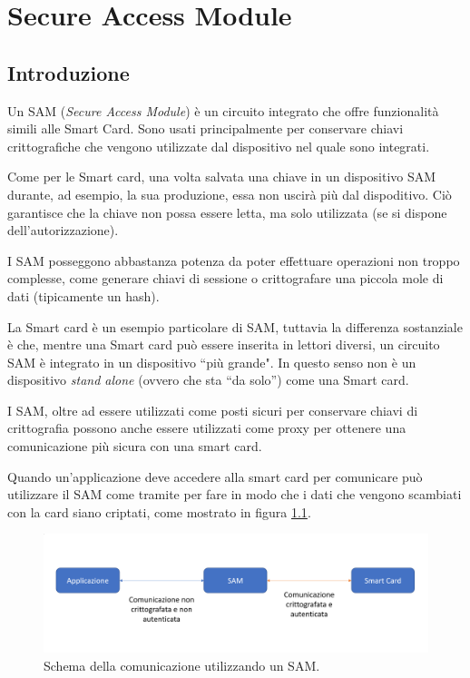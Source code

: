 \chapter{Secure Access Module}
\label{chapter3}

\section{Introduzione}
Un SAM (\textit{Secure Access Module}) è un circuito integrato che offre funzionalità simili alle Smart Card. Sono usati principalmente per conservare chiavi crittografiche che vengono utilizzate dal dispositivo nel quale sono integrati.

Come per le Smart card, una volta salvata una chiave in un dispositivo SAM durante, ad esempio, la sua produzione, essa non uscirà più dal dispoditivo. Ciò garantisce che la chiave non possa essere letta, ma solo utilizzata (se si dispone dell'autorizzazione).

I SAM posseggono abbastanza potenza da poter effettuare operazioni non troppo complesse, come generare chiavi di sessione o crittografare una piccola mole di dati (tipicamente un hash).

La Smart card è un esempio particolare di SAM, tuttavia la differenza sostanziale è che, mentre una Smart card può essere inserita in lettori diversi, un circuito SAM è integrato in un dispositivo ``più grande". In questo senso non è un dispositivo \textit{stand alone} (ovvero che sta ``da solo'') come una Smart card.

I SAM, oltre ad essere utilizzati come posti sicuri per conservare chiavi di crittografia possono anche essere utilizzati come proxy per ottenere una comunicazione più sicura con una smart card.

Quando un'applicazione deve accedere alla smart card per comunicare può utilizzare il SAM come tramite per fare in modo che i dati che vengono scambiati con la card siano criptati, come mostrato in figura \ref{fig:proxy_sam}.

\begin{figure}[h!]
  \centering
  \includegraphics[width=410pt]{pictures/proxy_sam.png}
  \caption{Schema della comunicazione utilizzando un SAM.}
  \label{fig:proxy_sam}
\end{figure}

